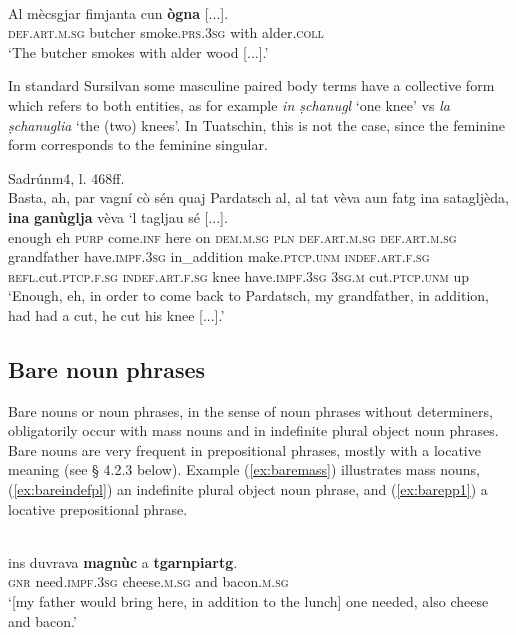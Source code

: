 \ea
{}\\
\gll  Al mècsgjar fimjanta cun \textbf{ògna} [...].\\
\textsc{def.art.m.sg} butcher smoke.\textsc{prs.3sg} with alder.\textsc{coll} \\
\glt `The butcher smokes with alder wood [...].'
\z

In standard Sursilvan some masculine paired body terms have a collective form which refers to both entities, as for example \textit{in ṣchanugl} `one knee’ vs \textit{la ṣchanuglia} `the (two) knees’. In Tuatschin, this is not the case, since the feminine form corresponds to the feminine singular.

\ea

 {Sadrún}{m4, l. 468ff.}\\
\gll   Basta, ah, par vagní cò sén quaj Pardatsch al, al tat vèva aun fatg ina satagljèda, \textbf{ina} \textbf{ganùglja} vèva `l tagljau sé [...]. \\
enough eh \textsc{purp} come.\textsc{inf} here on \textsc{dem.m.sg} \textsc{pln} \textsc{def.art.m.sg} \textsc{def.art.m.sg} grandfather have.\textsc{impf.3sg} in\_addition make.\textsc{ptcp.unm} \textsc{indef.art.f.sg} \textsc{refl.}cut.\textsc{ptcp.f.sg} \textsc{indef.art.f.sg} knee have.\textsc{impf.3sg} \textsc{3sg.m} cut.\textsc{ptcp.unm} up\\
\glt `Enough, eh, in order to come back to Pardatsch, my grandfather, in addition, had had a cut, he cut his knee [...].'
\z

\subsection{Bare noun phrases}
Bare nouns or noun phrases, in the sense of noun phrases without determiners, obligatorily occur with mass nouns and in indefinite plural object noun phrases. Bare nouns are very frequent in prepositional phrases, mostly with a locative meaning (see § 4.2.3 below). Example (\ref{ex:baremass}) illustrates mass nouns, (\ref{ex:bareindefpl}) an indefinite plural object noun phrase, and (\ref{ex:barepp1}) a locative prepositional phrase.

\ea
\label{ex:baremass}
\\
	\gll [...] ins duvrava \textbf{magnùc} a \textbf{tgarnpiartg}.   \\
{} \textsc{gnr} need.\textsc{impf.3sg} cheese.\textsc{m.sg} and bacon.\textsc{m.sg} \\
\glt `[my father would bring here, in addition to the lunch] one needed, also cheese and bacon.'
\z

